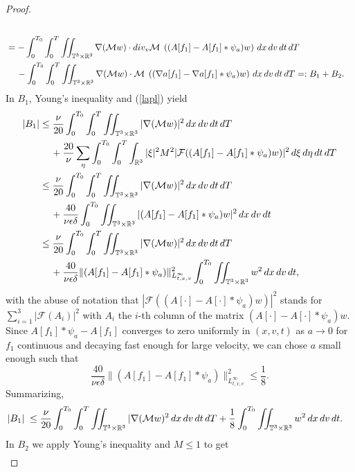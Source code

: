 \documentclass[10pt,a4paper]{amsart}
\newcommand{\Eps}{\epsilon}
\newcommand{\R}{\mathbb R}
\newcommand{\T}{\mathbb{T}}
\newcommand{\dT}{\, {\rm d} T}
\newcommand{\deta}{\, {\rm d} \eta}
\newcommand{\dt}{\, {\rm d} t}
\newcommand{\dv}{\, {\rm d} v}
\newcommand{\dxi}{\, {\rm d} \xi}
\newcommand{\dx}{\, {\rm d} x}
\begin{document}
\begin{proof}
\begin{align*}
\\
&= - \int_0^{T_0}\int_0^{T} \iint_{\T^3 \times \R^3}  \nabla (\mathcal{M} w) \cdot \textrm{div}_v \mathcal{M} \;\left( (A[f_1]-A[f_1]\ast \psi_a)  w \right) \dx\dv\dt\dT
\\
& \quad \,
- \int_0^{T_0}\int_0^{T} \iint_{\T^3 \times \R^3}  \nabla (\mathcal{M} w) \cdot \mathcal{M} \;\left( (\nabla a[f_1]-\nabla a[f_1]\ast \psi_a)  w \right)\dx\dv\dt\dT =: B_1+B_2.
\end{align*}
In $B_1$, Young's inequality and (\ref{lapl}) yield
\begin{align*}
    |B_1| 
& \leq   
 \frac{\nu}{20} \int_0^{T_0}\int_0^{T} \iint_{\T^3 \times \R^3}  |\nabla(\mathcal{M} w)|^2 \dx\dv\dt\dT 
\\
& \quad \, 
    + \frac{20}{\nu} \sum_\eta \int_0^{T_0}\int_0^{T} \int_{\R^3}  |\xi|^2 M^2 |  \mathcal{F}({(A[f_1]- A[f_1]\ast \psi_a) w})|^2  \dxi \deta \dt\dT 
\\
& \leq  
   \frac{\nu}{20} \int_0^{T_0}\int_0^{T} \iint_{\T^3 \times \R^3}  |\nabla(\mathcal{M} w)|^2 \dx\dv\dt\dT 
\\
    & \quad \,
    +  \frac{40}{\nu \Eps \delta} \int_0^{T_0} \iint_{\T^3 \times \R^3}  |  (A[f_1]- A[f_1]\ast \psi_a) w|^2  \dx \dv \dt
\\
& \leq  
\frac{\nu}{20} \int_0^{T_0}\int_0^{T} \iint_{\T^3 \times \R^3}  |\nabla(\mathcal{M} w)|^2 \dx\dv\dt\dT 
\\
& \quad \, 
+  \frac{40}{\nu \Eps \delta}\|  (A[f_1]- A[f_1]\ast \psi_a)\|_{L^{\infty}_{t,x,v}}^2 \int_0^{T_0} \iint_{\T^3 \times \R^3}  w^2  \dx \dv \dt ,
\end{align*}
with the abuse of notation that $|  \mathcal{F}({(A[\cdot]- A[\cdot]\ast \psi_a) w})|^2$ stands for $\sum_{i=1}^3 |\mathcal{F}(A_i)|^2$ with $A_i$ the $i$-th column of the matrix $(A[\cdot]- A[\cdot]\ast \psi_a)w$.  Since $A[f_1]\ast \psi_a-A[f_1]$ converges to zero uniformly  in $(x,v,t)$  as $a \to 0$ for $f_1$ continuous and decaying fast enough for large velocity, we can chose  $a$ small enough such that 
$$
 \frac{40}{\nu \Eps \delta} \|  (A[f_1]- A[f_1]\ast \psi_a)\|_{L^{\infty}_{t,x,v}}^2 \le  \frac{1}{8}. 
$$
 Summarizing, 
 \begin{align*}
    |B_1|  \; \le \; &    \frac{\nu}{20} \int_0^{T_0}\int_0^{T} \iint_{\T^3 \times \R^3}  |\nabla(\mathcal{M} w)^2 \dx\dv\dt\dT  + \frac{1}{8} \int_0^{T_0} \iint_{\T^3 \times \R^3}  w^2  \dx \dv \dt.
 \end{align*}
In $B_2$ we apply Young's inequality and ${M}\le 1$ to get 
\begin{align*}

\end{align*}
\end{proof}
\end{document}
